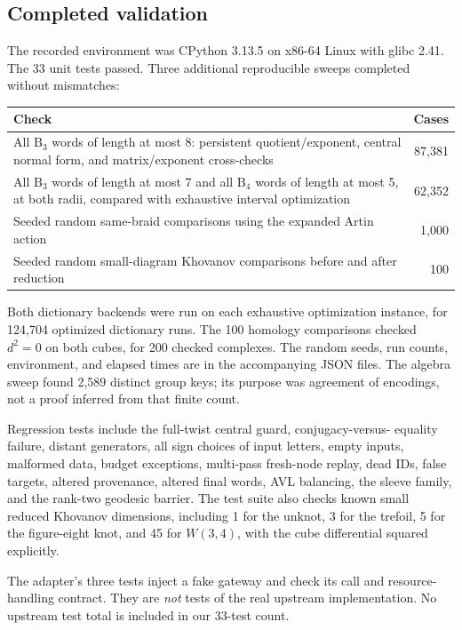 \documentclass[11pt]{article}
\theoremstyle{definition}
\theoremstyle{remark}
\newcommand{\B}{\mathrm B}
\begin{document}
\subsection{Completed validation}
The recorded environment was CPython 3.13.5 on x86-64 Linux with glibc 2.41.
The 33 unit tests passed. Three additional reproducible sweeps completed
without mismatches:
\begin{center}
\begin{tabular}{p{.54\linewidth}r}
\toprule
Check & Cases\\
\midrule
All $\B_3$ words of length at most 8: persistent quotient/exponent,
central normal form, and matrix/exponent cross-checks & 87,381\\[4pt]
All $\B_3$ words of length at most 7 and all $\B_4$ words of length at most 5,
at both radii, compared with exhaustive interval optimization & 62,352\\[4pt]
Seeded random same-braid comparisons using the expanded Artin action & 1,000\\[4pt]
Seeded random small-diagram Khovanov comparisons before and after reduction & 100\\
\bottomrule
\end{tabular}
\end{center}
Both dictionary backends were run on each exhaustive optimization instance,
for 124,704 optimized dictionary runs. The 100 homology comparisons checked
$d^2=0$ on both cubes, for 200 checked complexes. The random seeds, run
counts, environment, and elapsed times are in the accompanying JSON files.
The algebra sweep found 2,589 distinct group keys; its purpose was agreement
of encodings, not a proof inferred from that finite count.

Regression tests include the full-twist central guard, conjugacy-versus-
equality failure, distant generators, all sign choices of input letters,
empty inputs, malformed data, budget exceptions, multi-pass fresh-node
replay, dead IDs, false targets, altered provenance, altered final words,
AVL balancing, the sleeve family, and the rank-two geodesic barrier.
The test suite also checks known small reduced Khovanov dimensions, including
1 for the unknot, 3 for the trefoil, 5 for the figure-eight knot, and 45
for $W(3,4)$, with the cube differential squared explicitly.

The adapter's three tests inject a fake gateway and check its call and
resource-handling contract. They are \emph{not} tests of the real upstream
implementation. No upstream test total is included in our 33-test count.
\end{document}

